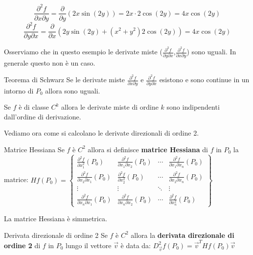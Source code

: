 \[
\frac{\partial^2 f}{\partial x \partial y} = \frac{\partial}{\partial y} \left( 2x\sin(2y) \right) = 2x \cdot 2\cos(2y) = 4x\cos(2y)
\]
\[
\frac{\partial^2 f}{\partial y \partial x} = \frac{\partial}{\partial x} \left( 2y\sin(2y) + (x^2 + y^2)2\cos(2y) \right) = 4x\cos(2y)
\]

Osserviamo che in questo esempio le derivate miste ($\frac{\partial^2 f}{\partial y \partial x}$,$\frac{\partial^2 f}{\partial x \partial y}$) sono uguali. In generale questo non è un caso.

\begin{teorema}{Teorema di Schwarz}
  Se le derivate miste $\frac{\partial^2 f}{\partial x \partial y}$ e $\frac{\partial^2 f}{\partial y \partial x}$ esistono e sono continue in un intorno di $P_0$ allora sono uguali.
\end{teorema}

\begin{corollario}{}
  Se $f$ è di classe $C^k$ allora le derivate miste di ordine $k$ sono indipendenti dall'ordine di derivazione.
\end{corollario}

Vediamo ora come si calcolano le derivate direzionali di ordine 2.
\begin{definizione}{Matrice Hessiana}
  Se $f$ è $C^2$ allora si definisce \textbf{matrice Hessiana} di $f$ in $P_0$ la matrice:
  $Hf(P_0)=\begin{Bmatrix}
    \frac{\partial^2 f}{\partial x_1^2}(P_0) & \frac{\partial^2 f}{\partial x_1 \partial x_2}(P_0) & \cdots & \frac{\partial^2 f}{\partial x_1 \partial x_n}(P_0)\\
    \frac{\partial^2 f}{\partial x_2 \partial x_1}(P_0) & \frac{\partial^2 f}{\partial x_2^2}(P_0) & \cdots & \frac{\partial^2 f}{\partial x_2 \partial x_n}(P_0)\\
    \vdots & \vdots & \ddots & \vdots\\
    \frac{\partial^2 f}{\partial x_n \partial x_1}(P_0) & \frac{\partial^2 f}{\partial x_n \partial x_2}(P_0) & \cdots & \frac{\partial^2 f}{\partial x_n^2}(P_0)
  \end{Bmatrix}$
\end{definizione}
\begin{osservazione}{}
  La matrice Hessiana è simmetrica.
\end{osservazione}

\begin{definizione}{Derivata direzionale di ordine 2}
  Se $f$ è $C^2$ allora la \textbf{derivata direzionale di ordine 2} di $f$ in $P_0$ lungo il vettore $\vec v$ è data da:
  $D^2_{\vec v}f(P_0)=\vec v^T Hf(P_0) \vec v$
\end{definizione}


